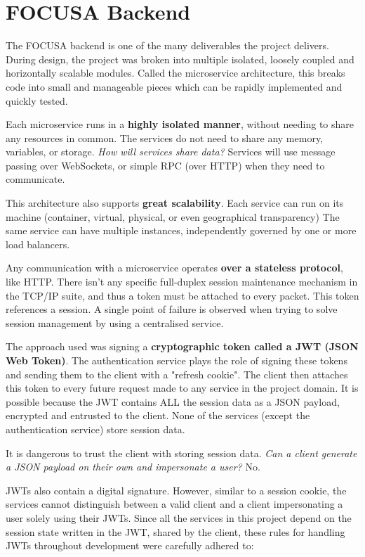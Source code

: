 \section{FOCUSA Backend}

The FOCUSA backend is one of the many deliverables the project delivers.
During design, the project was broken into multiple isolated, loosely coupled and horizontally scalable modules. 
Called the microservice architecture, this breaks code into small and manageable pieces which can be rapidly implemented and quickly tested.

Each microservice runs in a \textbf{highly isolated manner}, without needing to share any resources in common. The services do not need to share any memory, variables, or storage. 
\emph{How will services share data?} 
Services will use message passing over WebSockets, or simple RPC (over HTTP) when they need to communicate.

This architecture also supports \textbf{great scalability}. Each service can run on its machine (container, virtual, physical, or 
even geographical transparency) 
The same service can have multiple instances, independently governed by one or more load balancers.

Any communication with a microservice operates \textbf{over a stateless protocol}, like HTTP.
There isn't any specific full-duplex session maintenance mechanism in the TCP/IP suite, and thus a token must be attached to every packet. This token references a session. A single point of failure is observed when trying to solve session management by using a centralised service.

The approach used was signing a \textbf{cryptographic token called a JWT (JSON Web Token)}. 
The authentication service plays the role of signing these tokens and sending them to the client with a "refresh cookie". The client then attaches this token to every future request made to any service in the project domain. It is possible because the JWT contains 
ALL the session data as a JSON payload, encrypted and entrusted to the client. None of the services (except the authentication service) store session data.

It is dangerous to trust the client with storing session data. \emph{Can a client generate a JSON payload on their own and impersonate a user?} No.~\cite{JWTBestPractices}

JWTs also contain a digital signature. However, similar to a session cookie, the services cannot distinguish between a valid client and a client impersonating a user solely using their JWTs. Since all the services in this project depend on the session state written in the JWT, shared by the client, these rules for handling JWTs throughout development were carefully adhered to:

